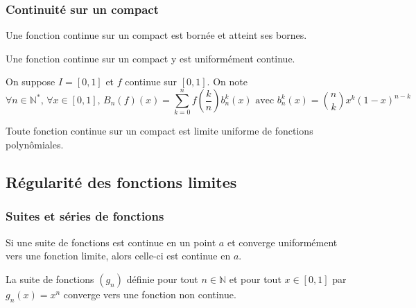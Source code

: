 	\subsubsection{Continuité sur un compact}


	\begin{proposition}
		Une fonction continue sur un compact est bornée et atteint ses bornes.
	\end{proposition}

	\begin{theorem}[Heine]
		Une fonction continue sur un compact y est uniformément continue.
	\end{theorem}


	\begin{theorem}[Bernstein]
		On suppose $I = [0,1]$ et $f$ continue sur $[0,1]$. On note
		\[ \forall n \in \mathbb{N}^*, \, \forall x \in [0,1], \, B_n(f)(x) = \sum_{k=0}^n f \left(\frac{k}{n}\right) b_n^k(x) \text{ avec } b_n^k(x) = \binom{n}{k} x^k (1-x)^{n-k} \]
	\end{theorem}


	\begin{theorem}[Weierstrass]
		Toute fonction continue sur un compact est limite uniforme de fonctions polynômiales.
	\end{theorem}

	\subsection{Régularité des fonctions limites}

	\subsubsection{Suites et séries de fonctions}


	\begin{proposition}
		Si une suite de fonctions est continue en un point $a$ et converge uniformément vers une fonction limite, alors celle-ci est continue en $a$.
	\end{proposition}

	\begin{cexample}
		La suite de fonctions $(g_n)$ définie pour tout $n \in \mathbb{N}$ et pour tout $x \in [0,1]$ par $g_n(x) = x^n$ converge vers une fonction non continue.
	\end{cexample}

